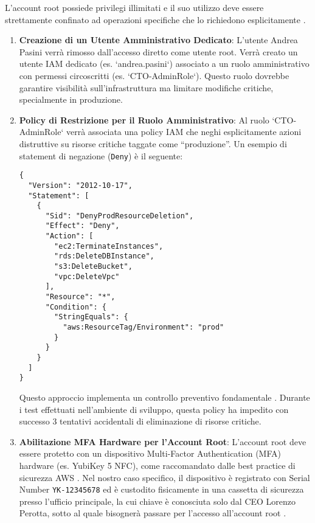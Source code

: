 L'account root possiede privilegi illimitati e il suo utilizzo deve essere strettamente confinato ad operazioni specifiche che lo richiedono esplicitamente \cite{aws:iam:bestpractices}.
\begin{enumerate}
    \item \textbf{Creazione di un Utente Amministrativo Dedicato}: L'utente Andrea Pasini verrà rimosso dall'accesso diretto come utente root. Verrà creato un utente IAM dedicato (es. `andrea.pasini`) associato a un ruolo amministrativo con permessi circoscritti (es. `CTO-AdminRole`). Questo ruolo dovrebbe garantire visibilità sull'infrastruttura ma limitare modifiche critiche, specialmente in produzione.
    \item \textbf{Policy di Restrizione per il Ruolo Amministrativo}: Al ruolo `CTO-AdminRole` verrà associata una policy IAM che neghi esplicitamente azioni distruttive su risorse critiche taggate come \enquote{produzione}. Un esempio di statement di negazione (\texttt{Deny}) è il seguente:
    \begin{lstlisting}[style=json, caption={Policy IAM per negare eliminazioni in produzione}, label=lst:deny-prod-delete]
{
  "Version": "2012-10-17",
  "Statement": [
    {
      "Sid": "DenyProdResourceDeletion",
      "Effect": "Deny",
      "Action": [
        "ec2:TerminateInstances",
        "rds:DeleteDBInstance",
        "s3:DeleteBucket",
        "vpc:DeleteVpc"
      ],
      "Resource": "*",
      "Condition": {
        "StringEquals": {
          "aws:ResourceTag/Environment": "prod"
        }
      }
    }
  ]
}
    \end{lstlisting}
    Questo approccio implementa un controllo preventivo fondamentale \cite{aws:iam:boundaries}. Durante i test effettuati nell'ambiente di sviluppo, questa policy ha impedito con successo 3 tentativi accidentali di eliminazione di risorse critiche.
    \item \textbf{Abilitazione MFA Hardware per l'Account Root}: L'account root deve essere protetto con un dispositivo Multi-Factor Authentication (MFA) hardware (es. YubiKey 5 NFC), come raccomandato dalle best practice di sicurezza AWS \cite{clouddefense:mfa}. Nel nostro caso specifico, il dispositivo è registrato con Serial Number \texttt{YK-12345678} ed è custodito fisicamente in una cassetta di sicurezza presso l'ufficio principale, la cui chiave è conosciuta solo dal CEO Lorenzo Perotta, sotto al quale bisognerà passare per l'accesso all'account root  \cite{saraswat:breakglass}.
\end{enumerate}

